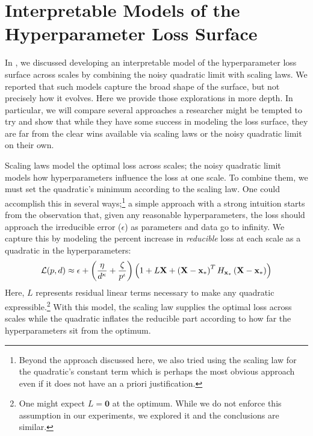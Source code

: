 \section{Interpretable Models of the Hyperparameter Loss Surface}
\label{app:interpretable-models-of-the-hyperparameter-loss-surface}

In , we discussed developing an interpretable model of the hyperparameter loss surface across scales by combining the noisy quadratic limit with scaling laws. We reported that such models capture the broad shape of the surface, but not precisely how it evolves. Here we provide those explorations in more depth. In particular, we will compare several approaches a researcher might be tempted to try and show that while they have some success in modeling the loss surface, they are far from the clear wins available via scaling laws or the noisy quadratic limit on their own.

Scaling laws model the optimal loss across scales; the noisy quadratic limit models how hyperparameters influence the loss at one scale. To combine them, we must set the quadratic's minimum according to the scaling law. One could accomplish this in several ways;\footnote{
    Beyond the approach discussed here, we also tried using the scaling law for the quadratic's constant term which is perhaps the most obvious approach even if it does not have an a priori justification.
} a simple approach with a strong intuition starts from the observation that, given any reasonable hyperparameters, the loss should approach the irreducible error ($\epsilon$) as parameters and data go to infinity. We capture this by modeling the percent increase in \textit{reducible} loss at each scale as a quadratic in the hyperparameters:
%
\begin{equation}\label{eq:static-empirical-model_hessian}
    \mathcal{L}(p, d) \approx \epsilon + \left(\frac{\eta}{d^\kappa} + \frac{\zeta}{p^\iota}\right)\left(1 + L \mathbf{X} + \left(\mathbf{X} - \mathbf{x}_*\right)^T H_{\mathbf{x}_*} \left(\mathbf{X} - \mathbf{x}_*\right)\right)
\end{equation}
%
Here, $L$ represents residual linear terms necessary to make any quadratic expressible.\footnote{
    One might expect $L = \pmb{0}$ at the optimum. While we do not enforce this assumption in our experiments, we explored it and the conclusions are similar.
} With this model, the scaling law supplies the optimal loss across scales while the quadratic inflates the reducible part according to how far the hyperparameters sit from the optimum.

